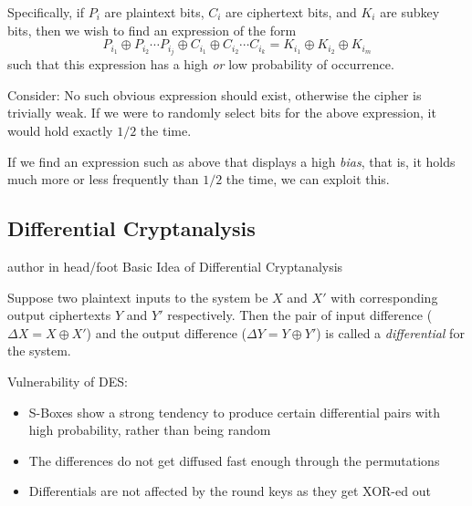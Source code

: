 \documentclass[9pt]{beamer}
\begin{document}
\begin{frame}
Specifically, if $P_{i}$ are plaintext bits, $C_{i}$ are ciphertext bits, and $K_{i}$ are subkey bits, then we wish to find an expression of the form
\[ P_{i_1} \oplus P_{i_2} \cdots P_{i_j} \oplus C_{i_1} \oplus C_{i_2} \cdots C_{i_k} = K_{i_1} \oplus K_{i_2} \oplus K_{i_m} \]
\pause such that this expression has a high \textit{or} low probability of occurrence.

\vspace{5mm}
\pause Consider: No such obvious expression should exist, otherwise the cipher is trivially weak. If we were to randomly select bits for the above expression, it would hold exactly $1/2$ the time. 

\vspace{5mm}
\pause If we find an expression such as above that displays a high \textit{bias}, that is, it holds much more or less frequently than $1/2$ the time, we can exploit this.
\end{frame}


\subsection{Differential Cryptanalysis}
\begin{frame}
\begin{beamercolorbox}[ht=2.5ex,dp=1.125ex,center,rounded=true,shadow=true]{author in head/foot}
Basic Idea of Differential Cryptanalysis
\end{beamercolorbox}
\end{frame}

\begin{frame}
\begin{definition}[Differential]
Suppose two plaintext inputs to the system be $X$ and $X'$ with corresponding output ciphertexts $Y$ and $Y'$ respectively. 
Then the pair of input difference ($\Delta X = X \oplus X'$) and the output difference ($\Delta Y = Y \oplus Y'$) is called a {\it differential} for the system.
\end{definition}

\vspace{0.2in}
\pause Vulnerability of DES:

\begin{itemize}[<+->]
\item{S-Boxes show a strong tendency to produce certain differential pairs with high probability, rather than being random}
\item{The differences do not get diffused fast enough through the permutations}
\item{Differentials are not affected by the round keys as they get XOR-ed out}
\end{itemize}
\end{frame}
\end{document}
